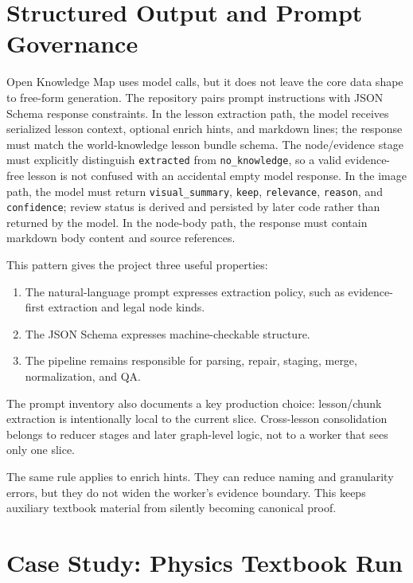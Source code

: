 \documentclass[11pt,letterpaper]{article}
\newcommand{\code}[1]{\nolinkurl{#1}}
\newcommand{\OKM}{Open Knowledge Map}
\begin{document}
\section{Structured Output and Prompt Governance}

\OKM{} uses model calls, but it does not leave the core data shape to free-form generation. The repository pairs prompt instructions with JSON Schema response constraints. In the lesson extraction path, the model receives serialized lesson context, optional enrich hints, and markdown lines; the response must match the world-knowledge lesson bundle schema. The node/evidence stage must explicitly distinguish \code{extracted} from \code{no_knowledge}, so a valid evidence-free lesson is not confused with an accidental empty model response. In the image path, the model must return \code{visual_summary}, \code{keep}, \code{relevance}, \code{reason}, and \code{confidence}; review status is derived and persisted by later code rather than returned by the model. In the node-body path, the response must contain markdown body content and source references.

This pattern gives the project three useful properties:

\begin{enumerate}
  \item The natural-language prompt expresses extraction policy, such as evidence-first extraction and legal node kinds.
  \item The JSON Schema expresses machine-checkable structure.
  \item The pipeline remains responsible for parsing, repair, staging, merge, normalization, and QA.
\end{enumerate}

The prompt inventory also documents a key production choice: lesson/chunk extraction is intentionally local to the current slice. Cross-lesson consolidation belongs to reducer stages and later graph-level logic, not to a worker that sees only one slice.

The same rule applies to enrich hints. They can reduce naming and granularity errors, but they do not widen the worker's evidence boundary. This keeps auxiliary textbook material from silently becoming canonical proof.

\section{Case Study: Physics Textbook Run}
\label{sec:physics-case-study}
\end{document}
